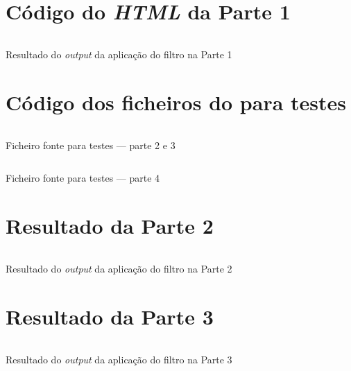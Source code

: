 \appendix

\chapter{Código do \emph{HTML} da Parte 1}
\label{appendix:a}

\begin{longlisting}
	\inputminted{html}{testes/res_html.html}
	\caption{Resultado do \emph{output} da aplicação do filtro na Parte 1}
	\label{listing:a}
\end{longlisting}


\chapter{Código dos ficheiros do  para testes}
\label{appendix:a1}

\begin{longlisting}
	\inputminted{tex}{testes/ex3.bib}
	\caption{Ficheiro fonte  para testes --- parte 2 e 3}
	\label{listing:a1}
\end{longlisting}

\begin{longlisting}
	\inputminted{tex}{testes/ex4.bib}
	\caption{Ficheiro fonte  para testes --- parte 4}
	\label{listing:a2}
\end{longlisting}

\chapter{Resultado da Parte 2}
\label{appendix:b}

\begin{longlisting}
	\inputminted{tex}{testes/resNorm.bib}
	\caption{Resultado do \emph{output} da aplicação do filtro na Parte 2}

	\label{listing:b}
\end{longlisting}

\chapter{Resultado da Parte 3}
\label{appendix:c}

\begin{longlisting}
	\inputminted{tex}{testes/res_pretty_printing.txt}
	\caption{Resultado do \emph{output} da aplicação do filtro na Parte 3}

	\label{listing:c}
\end{longlisting}

